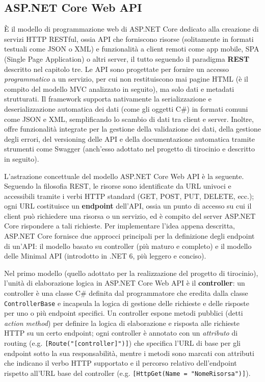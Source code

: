 \subsection{ASP.NET Core Web API}
È il modello di programmazione web di ASP.NET Core dedicato alla creazione di servizi HTTP RESTful, ossia API che forniscono risorse (solitamente in formati testuali come JSON o XML) e funzionalità a client remoti come app mobile, SPA (Single Page Application) o altri server, il tutto seguendo il paradigma \textbf{REST} descritto nel capitolo tre. Le API sono progettate per fornire un accesso \emph{programmatico} a un servizio, per cui non restituiscono mai pagine HTML (è il compito del modello MVC analizzato in seguito), ma solo dati e metadati strutturati.
Il framework supporta nativamente la serializzazione e deserializzazione automatica dei dati (come gli oggetti C\#) in formati comuni come JSON e XML, semplificando lo scambio di dati tra client e server. Inoltre, offre funzionalità integrate per la gestione della validazione dei dati, della gestione degli errori, del versioning delle API e della documentazione automatica tramite strumenti come Swagger (anch'esso adottato nel progetto di tirocinio e descritto in seguito).

L'astrazione concettuale del modello ASP.NET Core Web API è la seguente. Seguendo la filosofia REST, le risorse sono identificate da URL univoci e accessibili tramite i verbi HTTP standard (GET, POST, PUT, DELETE, ecc.); ogni URL costituisce un \textbf{endpoint} dell'API, ossia un punto di accesso su cui il client può richiedere una risorsa o un servizio, ed è compito del server ASP.NET Core rispondere a tali richieste.
Per implementare l'idea appena descritta, ASP.NET Core fornisce due approcci principali per la definizione degli endpoint di un'API: il modello basato su controller (più maturo e completo) e il modello delle Minimal API (introdotto in .NET 6, più leggero e conciso).

Nel primo modello (quello adottato per la realizzazione del progetto di tirocinio), l'unità di elaborazione logica in ASP.NET Core Web API è il \textbf{controller}: un controller è una classe C\# definita dal programmatore che eredita dalla classe \texttt{ControllerBase} e incapsula la logica di gestione delle richieste e delle risposte per uno o più endpoint specifici.
Un controller espone metodi pubblici (detti \emph{action method}) per definire la logica di elaborazione e risposta alle richieste HTTP su un certo endpoint; ogni controller è annotato con un \emph{attributo} di routing (e.g. \texttt{[Route("[controller]")]}) che specifica l'URL di base per gli endpoint sotto la sua responsabilità, mentre i metodi sono marcati con attributi che indicano il verbo HTTP supportato e il percorso relativo dell'endpoint rispetto all'URL base del controller (e.g. \texttt{[HttpGet(Name = "NomeRisorsa")]}).

